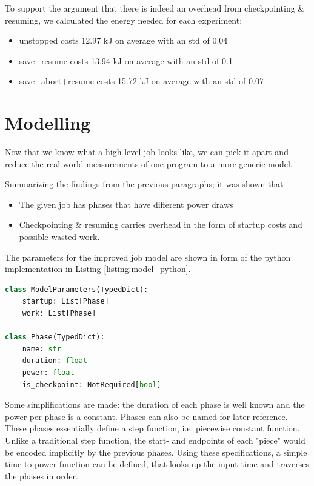To support the argument that there is indeed an overhead from checkpointing \& resuming, we calculated the energy needed for each experiment:

\begin{itemize}
    \item  unstopped costs 12.97 kJ on average with an std of 0.04
    \item  save+resume costs 13.94 kJ on average with an std of 0.1
    \item  save+abort+resume costs 15.72 kJ on average with an std of 0.07
\end{itemize}

\section{Modelling}

Now that we know what a high-level job looks like, we can pick it apart and reduce the real-world measurements of one program to a more generic model. 

Summarizing the findings from the previous paragraphs; it was shown that 

\begin{itemize}
    \item The given job has phases that have different power draws
    \item Checkpointing \& resuming carries overhead in the form of startup costs and possible wasted work.
\end{itemize}

The parameters for the improved job model are shown in form of the python implementation in Listing \ref{listing:model_python}.

\begin{minipage}{\linewidth}
\begin{lstlisting}[language=python, frame=single, numbers=none, caption={Python Model definition}, basicstyle=\ttfamily, label={listing:model_python}]
class ModelParameters(TypedDict):
    startup: List[Phase]
    work: List[Phase]
    
class Phase(TypedDict):
    name: str
    duration: float
    power: float
    is_checkpoint: NotRequired[bool]   
\end{lstlisting}
\end{minipage}

Some simplifications are made: the duration of each phase is well known and the power per phase is a constant. 
Phases can also be named for later reference.
These phases essentially define a step function, i.e. piecewise constant function.
Unlike a traditional step function, the start- and endpoints of each "piece" would be encoded implicitly by the previous phases.
Using these specifications, a simple time-to-power function can be defined, that looks up the input time and traverses the phases in order.

